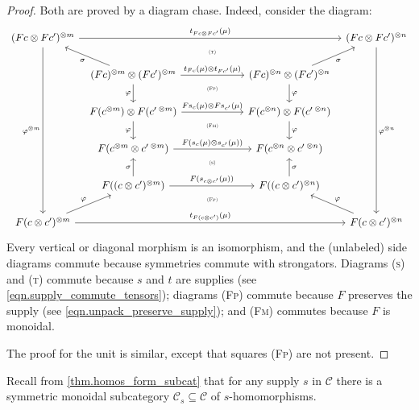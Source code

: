 \documentclass[11pt, oneside, article]{memoir}
\theoremstyle{plain}
\theoremstyle{definition}
\theoremstyle{remark}
\newcommand{\cat}[1]{\mathcal{#1}}%
\newcommand{\tpow}[1]{^{\otimes #1}}
\renewcommand{\ss}{\subseteq}
\begin{document}
\begin{proof}
Both are proved by a diagram chase. Indeed, consider the diagram:
\[
\begin{tikzcd}[column sep=6pt]
	(Fc\otimes Fc')\tpow{m}
		\ar[rrrr, "t_{Fc\otimes Fc'}(\mu)"]
		\ar[ddddd, "\varphi\tpow{m}"']
		\ar[from=dr, "\sigma"]&&[18pt]
		\ar[d, phantom, near start,  "\textsc{\tiny (t)}"]&[18pt]&
	(Fc\otimes Fc')\tpow{n}
		\ar[ddddd, "\varphi\tpow{n}"]
		\ar[from=dl, "\sigma"']\\&
	(Fc)\tpow{m}\otimes(Fc')\tpow{m}
		\ar[d, "\varphi"']
		\ar[rr, "t_{Fc}(\mu)\otimes t_{Fc'}(\mu)"]&
		\ar[d, phantom, near start, "\textsc{\tiny (Fp)}"]&
	(Fc)\tpow{n}\otimes(Fc')\tpow{n}
		\ar[d, "\varphi"]\\&
	F(c\tpow{m})\otimes F(c'\,\tpow{m})
		\ar[rr, "Fs_c(\mu)\otimes Fs_{c'}(\mu)"]
		\ar[d, "\varphi"']&
		\ar[d, phantom, near start, "\textsc{\tiny (Fm)}"]&
	F(c\tpow{n})\otimes F(c'\,\tpow{n})
		\ar[d, "\varphi"]\\&
	F(c\tpow{m}\otimes c'\,\tpow{m})
		\ar[rr, "F(s_c(\mu)\otimes s_{c'}(\mu))"]&
		\ar[d, phantom, near start, "\textsc{\tiny (s)}"]&
	F(c\tpow{n}\otimes c'\,\tpow{n})\\&
	F((c\otimes c')\tpow{m})
		\ar[u, "\sigma"]
		\ar[rr, "F(s_{c\otimes c'}(\mu))"]&
		\ar[d, phantom, near start, "\textsc{\tiny (Fp)}"]&
	F((c\otimes c')\tpow{n})
		\ar[u, "\sigma"']\\
	F(c\otimes c')\tpow{m}
		\ar[rrrr, "t_{F(c\otimes c')}(\mu)"]
		\ar[ur, "\varphi"]&&~&&
	F(c\otimes c')\tpow{n}
		\ar[ul, "\varphi"']
\end{tikzcd}
\]
Every vertical or diagonal morphism is an isomorphism, and the (unlabeled) side diagrams commute because symmetries commute with strongators. Diagrams \textsc{(s)} and \textsc{(t)} commute because $s$ and $t$ are supplies (see \cref{eqn.supply_commute_tensors}); diagrams \textsc{(Fp)} commute because $F$ preserves the supply (see \cref{eqn.unpack_preserve_supply}); and \textsc{(Fm)} commutes because $F$ is monoidal.

The proof for the unit is similar, except that squares \textsc{(Fp)} are not present.
\end{proof}

Recall from \cref{thm.homos_form_subcat} that for any supply $s$ in $\cat{C}$ there is a symmetric monoidal subcategory $\cat{C}_s\ss\cat{C}$ of $s$-homomorphisms.
\end{document}
